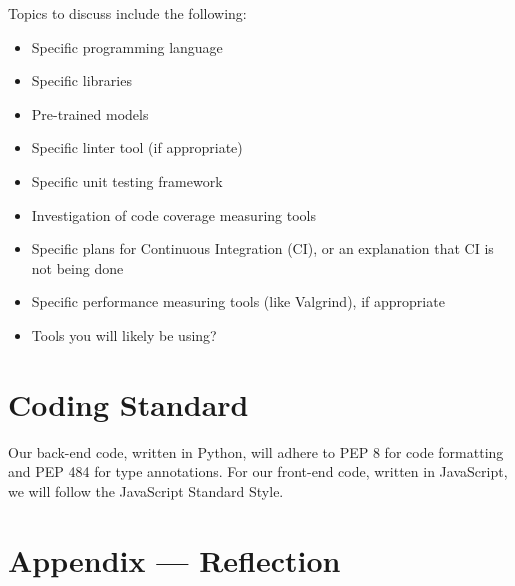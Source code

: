 \documentclass{article}
\begin{document}
\begin{itemize}
Topics to discuss include the following:

\begin{itemize}
\item Specific programming language
\item Specific libraries
\item Pre-trained models
\item Specific linter tool (if appropriate)
\item Specific unit testing framework
\item Investigation of code coverage measuring tools
\item Specific plans for Continuous Integration (CI), or an explanation that CI
  is not being done
\item Specific performance measuring tools (like Valgrind), if
  appropriate
\item Tools you will likely be using?
\end{itemize}


\section{Coding Standard}
Our back-end code, written in Python, will adhere to PEP 8 for code formatting and PEP 484 for type annotations. 
For our front-end code, written in JavaScript, we will follow the JavaScript Standard Style.

\newpage{}

\section*{Appendix --- Reflection}


% 


\end{itemize}
\end{document}
